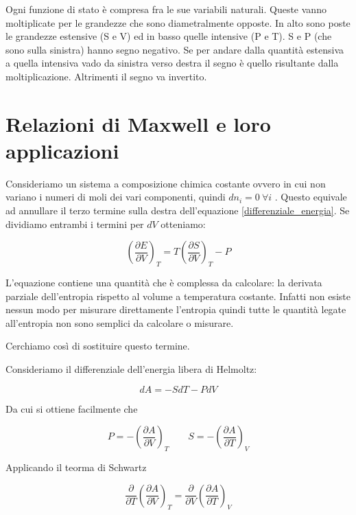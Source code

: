 Ogni funzione di stato è compresa fra le sue variabili naturali. Queste vanno moltiplicate per le grandezze che sono diametralmente opposte. 
In alto sono poste le grandezze estensive (S e V) ed in basso quelle intensive (P e T). S e P (che sono sulla sinistra) hanno segno negativo. Se per andare dalla quantità estensiva a quella intensiva vado da sinistra verso destra il segno è quello risultante dalla moltiplicazione. Altrimenti il segno va invertito.

\section{Relazioni di Maxwell e loro applicazioni}

Consideriamo un sistema a composizione chimica costante ovvero in cui non variano i numeri di moli dei vari componenti, quindi $dn_i = 0 \ \forall i$ . Questo equivale ad annullare il terzo termine sulla destra dell’equazione \eqref{differenziale_energia}. 
Se dividiamo entrambi i termini per $dV$ otteniamo:

\begin{equation}
    \left( \frac{\partial E}{\partial V} \right)_T = T \left( \frac{\partial S}{\partial V} \right)_T - P
\end{equation}

L’equazione contiene una quantità che è complessa da calcolare: la derivata parziale dell’entropia rispetto al volume a temperatura costante.
Infatti non esiste nessun modo per misurare direttamente l’entropia quindi tutte le quantità legate all’entropia non sono semplici da calcolare o misurare. 

Cerchiamo così di sostituire questo termine. 

Consideriamo il differenziale dell'energia libera di Helmoltz:

\begin{equation}
    dA = - SdT - P dV
\end{equation}

Da cui si ottiene facilmente che 

\begin{equation}
    P = - \left( \frac{\partial A}{\partial V} \right)_T \qquad S = -\left( \frac{\partial A}{\partial T} \right)_V
\end{equation}

Applicando il teorma di Schwartz

\begin{equation}
    \frac{\partial}{\partial T}\left( \frac{\partial A}{\partial V} \right)_T = \frac{\partial}{\partial V}\left( \frac{\partial A}{\partial T} \right)_V
\end{equation}

